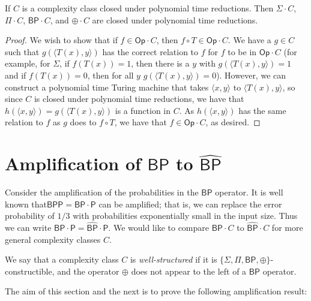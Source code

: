 \documentclass[11pt]{article}
\newcommand{\bp}{\textsf{BP}}
\newcommand{\strongbp}{\widehat{\textsf{BP}}}
\newcommand{\bpp}{\textsf{BPP}}
\newcommand{\parity}{\oplus}
\newcommand{\p}{\textsf{P}}
\newcommand{\op}{\textsf{Op}}
\begin{document}
\begin{lemma}
If $C$ is a complexity class closed under polynomial time reductions. Then $\Sigma \cdot C$, $\Pi\cdot C$, $\bp\cdot C$, and $\parity\cdot C$ are closed under polynomial time reductions.
\end{lemma}
\begin{proof}
We wish to show that if $f \in \op \cdot C$, then $f \circ T \in \op \cdot C$. We have a $g \in C$ such that $g(\langle T(x), y\rangle)$ has the correct relation to $f$ for $f$ to be in $\op \cdot C$ (for example, for $\Sigma$, if $f(T(x)) = 1$, then there is a $y$ with $g(\langle T(x), y\rangle) = 1$ and if $f(T(x)) = 0$, then for all $y$ $g(\langle T(x), y \rangle) = 0$). However, we can construct a polynomial time Turing machine that takes $\langle x, y\rangle$ to $\langle T(x), y\rangle$, so since $C$ is closed under polynomial time reductions, we have that $h(\langle x,y\rangle) = g(\langle T(x),y\rangle)$ is a function in $C$. As $h(\langle x,y\rangle)$ has the same relation to $f$ as $g$ does to $f \circ T$, we have that $f \in \op \cdot C$, as desired.
\end{proof}

\section{Amplification of $\bp$ to $\strongbp$\label{amplifysection}}

Consider the amplification of the probabilities in the $\bp$ operator. It is well known that\linebreak $\bpp = \bp \cdot \p$ can be amplified; that is, we can replace the error probability of $1/3$ with probabilities exponentially small in the input size. Thus we can write $\bp \cdot \p = \strongbp \cdot \p$. We would like to compare $\bp \cdot C$ to $\strongbp \cdot C$ for more general complexity classes $C$.

\begin{definition}
We say that a complexity class $C$ is \emph{well-structured} if it is $\{\Sigma, \Pi, \bp, \parity\}$-constructible, and the operator $\parity$ does not appear to the left of a $\bp$ operator.
\end{definition}

The aim of this section and the next is to prove the following amplification result:
\end{document}
